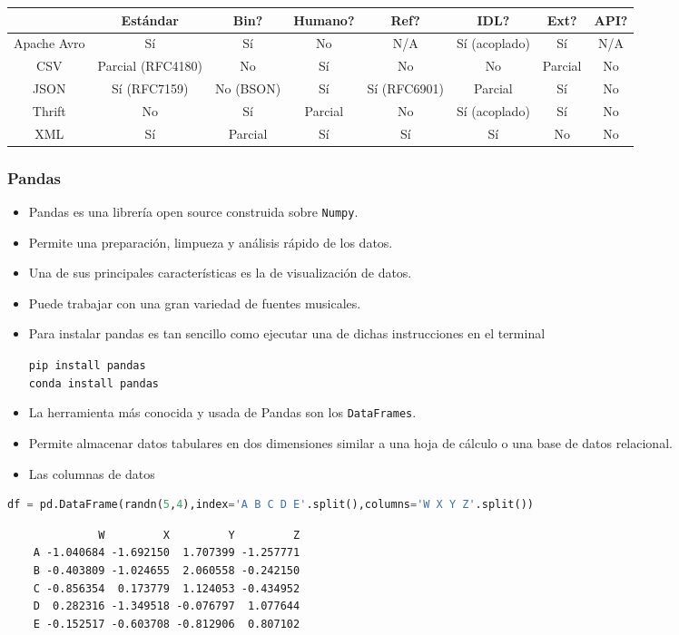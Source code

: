 \begin{center}
\begin{tabular}{cccccccc}
\hline
 & Estándar & Bin? & Humano? & Ref? & IDL? & Ext? & API? \\
\hline
Apache Avro & Sí & Sí  & No & N/A & Sí (acoplado) & Sí & N/A \\

CSV & Parcial (RFC4180) & No & Sí & No & No & Parcial  & No \\

JSON & Sí (RFC7159) & No (BSON) & Sí & Sí (RFC6901) & Parcial  & Sí & No \\

Thrift & No & Sí & Parcial  & No & Sí (acoplado) & Sí & No \\

XML & Sí & Parcial & Sí & Sí & Sí & No & No \\
\hline
\end{tabular}
\end{center}
\subsubsection{Pandas}
\begin{itemize}
\item Pandas es una librería open source construida sobre \texttt{Numpy}.
\item Permite una preparación, limpueza y análisis rápido de los datos.
\item Una de sus principales características es la de visualización de datos.
\item Puede trabajar con una gran variedad de fuentes musicales.
\item Para instalar pandas es tan sencillo como ejecutar una de dichas instrucciones en el terminal \begin{center}
	\texttt{pip install pandas}\\
	\texttt{conda install pandas}
\end{center}
\end{itemize}
\begin{itemize}
\item La herramienta más conocida y usada de Pandas son los \texttt{DataFrames}.
\item Permite almacenar datos tabulares en dos dimensiones similar a una hoja de cálculo o una base de datos relacional.
\item Las columnas de datos 
\end{itemize}
\begin{lstlisting}[language=Python]
df = pd.DataFrame(randn(5,4),index='A B C D E'.split(),columns='W X Y Z'.split())
\end{lstlisting}
\begin{verbatim}
	          W         X         Y         Z
	A -1.040684 -1.692150  1.707399 -1.257771
	B -0.403809 -1.024655  2.060558 -0.242150
	C -0.856354  0.173779  1.124053 -0.434952
	D  0.282316 -1.349518 -0.076797  1.077644
	E -0.152517 -0.603708 -0.812906  0.807102
\end{verbatim}

